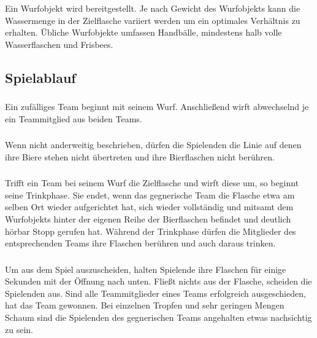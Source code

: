 \subsubsection{}
Ein Wurfobjekt wird bereitgestellt.
Je nach Gewicht des Wurfobjekts kann die Wassermenge in der Zielflasche variiert werden um ein optimales Verhältnis zu erhalten.
Übliche Wurfobjekte umfassen Handbälle, mindestens halb volle Wasserflaschen und Frisbees.

\subsection{Spielablauf}
\subsubsection{}
Ein zufälliges Team beginnt mit seinem Wurf.
Anschließend wirft abwechselnd je ein Teammitglied aus beiden Teams.

\subsubsection{}
Wenn nicht anderweitig beschrieben, dürfen die Spielenden die Linie auf denen ihre Biere stehen nicht übertreten und ihre Bierflaschen nicht berühren.

\subsubsection{}
Trifft ein Team bei seinem Wurf die Zielflasche und wirft diese um, so beginnt seine Trinkphase.
Sie endet, wenn das gegnerische Team die Flasche etwa am selben Ort wieder aufgerichtet hat, sich wieder vollständig und mitsamt dem Wurfobjekts hinter der eigenen Reihe der Bierflaschen befindet und deutlich hörbar \glqq{} Stopp\grqq{} gerufen hat.
Während der Trinkphase dürfen die Mitglieder des entsprechenden Teams ihre Flaschen berühren und auch daraus trinken.

\subsubsection{}
Um aus dem Spiel auszuscheiden, halten Spielende ihre Flaschen für einige Sekunden mit der Öffnung nach unten.
Fließt nichts aus der Flasche, scheiden die Spielenden aus.
Sind alle Teammitglieder eines Teams erfolgreich ausgeschieden, hat das Team gewonnen.
Bei einzelnen Tropfen und sehr geringen Mengen Schaum sind die Spielenden des gegnerischen Teams angehalten etwas nachsichtig zu sein.


